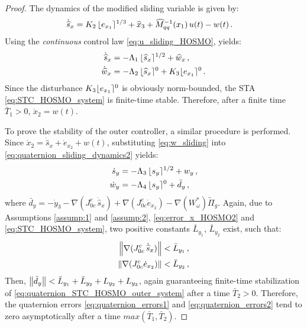 \begin{proof}
The dynamics of the modified sliding variable is given by:
%
\begin{align}
\dot{\widehat{s}}_x &= K_2 \, \lfloor e_{x_1} \rceil^{1/3} + \widehat{x}_3 + \widehat{M}^{-1}_{qq}(x_1) \, u(t) - w(t) \,.
\label{eq:dsx_sliding_HOSMO}
\end{align}
%
Using the {\it continuous} control law \eqref{eq:u_sliding_HOSMO}, yields:
%
\begin{align}
\dot{\widehat{s}}_x &= - \Lambda_1 \, \lfloor \widehat{s}_x \rceil^{1/2} + \widehat{w}_x \,, \nonumber \\
\dot{\widehat{w}}_x &= - \Lambda_2 \, \lfloor \widehat{s}_x \rceil^{0} + K_3 \lfloor e_{x_1} \rceil^{0} \,.
\label{eq:STC_HOSMO_system}
\end{align}
%
Since the disturbance $K_3 \lfloor e_{x_1} \rceil^{0}$ is obviously norm-bounded, the STA \eqref{eq:STC_HOSMO_system} is finite-time stable. Therefore, after a finite time $\bar{T}_1 > 0$, $\dot{x}_2 = w(t)$.

To prove the stability of the outer controller, a similar procedure is performed.
Since $\dot{x}_2 = \dot{\widehat{s}}_x + \dot{e}_{x_2} + w(t)$, substituting \eqref{eq:w_sliding} into \eqref{eq:quaternion_sliding_dynamics2} yields:
%
\begin{align}
\dot{s}_y &= - \Lambda_3 \, \lfloor s_y \rceil^{1/2} + w_y \,, \nonumber \\
\dot{w}_y &= - \Lambda_4 \, \lfloor s_y \rceil^{0} + \bar{d}_y \,,
\label{eq:quaternion_STC_HOSMO_outer_system}
\end{align}
%
where $\bar{d}_y = - \dot{y}_3 - \nabla( J^c_{0c} \, \dot{\widehat{s}}_x ) + \nabla ( J^c_{0c} \dot{e}_{x_2}) - \nabla( W^*_\omega ) \widetilde{\Pi}_g$.
%
Again, due to Assumptions \ref{assump:1} and \ref{assump:2}, \eqref{eq:error_x_HOSMO2} and \eqref{eq:STC_HOSMO_system}, two positive constants $\bar{L}_{y_1}$, $\bar{L}_{y_2}$ exist, such that:
%
\begin{align}
\left\lVert \nabla( J^c_{0c} \, \dot{\widehat{s}}_x ) \right\rVert &< \bar{L}_{y_1} \,, \label{eq:HOSMO_inequality_y1} \\
\left\lVert \nabla ( J^c_{0c} \dot{e}_{x_2}) \right\rVert &< \bar{L}_{y_2} \,, \label{eq:HOSMO_inequality_y2}
\end{align}
%
Then, $\left\lVert \bar{d}_y \right\rVert < \bar{L}_{y_1} + \bar{L}_{y_2} + L_{y_2} + L_{y_3}$, again guaranteeing finite-time stabilization of \eqref{eq:quaternion_STC_HOSMO_outer_system} after a time $\bar{T}_2>0$.
%
%
Therefore, the quaternion errors \eqref{eq:quaternion_errors1} and \eqref{eq:quaternion_errors2} tend to zero asymptotically after a time $max(\bar{T}_1,\bar{T}_2)$.

\end{proof}
